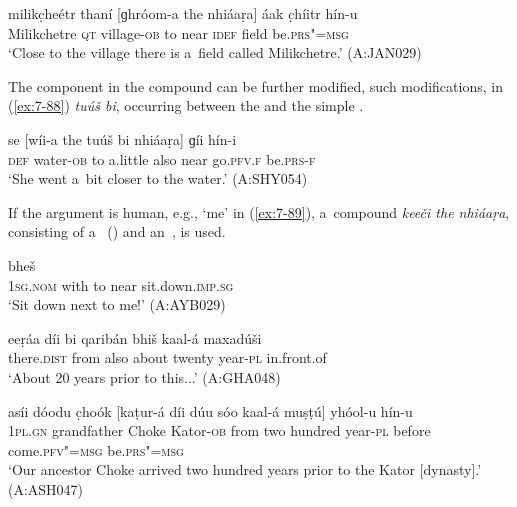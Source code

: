 
\begin{exe}
\ex
\label{ex:7-87}
\gll milikc̣heétr thaní [ɡhróom-a the nhiáaṛa] áak c̣híitr hín-u \\
Milikchetre \textsc{qt} village-\textsc{ob} to near \textsc{idef} field be.\textsc{prs"=msg} \\
\glt `Close to the village there is a~field called Milikchetre.' (A:JAN029)
\end{exe}

The  component in the compound can be further modified, such modifications, in (\ref{ex:7-88}) \textit{tuúš bi}, occurring between the  and the simple .

\begin{exe}
\ex
\label{ex:7-88}
\gll se [wíi-a the tuúš bi nhiáaṛa] ɡíi hín-i \\
\textsc{def} water-\textsc{ob} to a.little also near go.\textsc{pfv.f} be.\textsc{prs-f} \\
\glt `She went a~bit closer to the water.' (A:SHY054)
\end{exe}

If the argument is human, e.g., `me' in (\ref{ex:7-89}), a~compound \textit{keeči the nhiáaṛa}, consisting of a~ () and an~, is used.

\begin{exe}
\ex
\label{ex:7-89}
 bheš \\
\textsc{1sg.nom} with to near sit.down.\textsc{imp.sg} \\
\glt `Sit down next to me!' (A:AYB029)
\end{exe}


\begin{exe}
\ex
\label{ex:7-90}
\gll eeṛáa díi bi qaribán bhiš kaal-á maxadúši \\
there.\textsc{dist} from also about twenty year-\textsc{pl} in.front.of \\
\glt `About 20 years prior to this...' (A:GHA048)
\end{exe}
\begin{exe}
\ex
\label{ex:7-91}
\gll asíi dóodu c̣hoók [kaṭur-á díi dúu sóo kaal-á muṣṭú] yhóol-u
hín-u \\
\textsc{1pl.gn} grandfather Choke Kator-\textsc{ob} from two hundred year-\textsc{pl} before come.\textsc{pfv"=msg} be.\textsc{prs"=msg}  \\
\glt `Our ancestor Choke arrived two hundred years prior to the Kator [dynasty].' (A:ASH047)
\end{exe}

